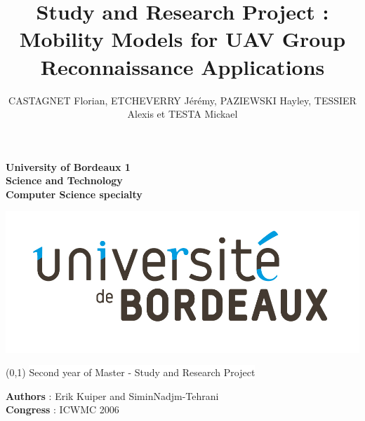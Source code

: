 \documentclass[12pt,a4paper]{report}
\author{CASTAGNET Florian, ETCHEVERRY Jérémy, PAZIEWSKI Hayley, TESSIER Alexis et TESTA Mickael}
\title{Study and Research Project : Mobility Models for UAV Group Reconnaissance Applications}
\begin{document}
\thispagestyle{empty}
\setcounter{page}{0}

\begin{minipage}{0.5\linewidth}
\begin{flushleft}
\textbf{University of Bordeaux 1 \\Science and Technology \\Computer Science specialty}\\ 
\end{flushleft}
\end{minipage}
\begin{minipage}{0.5\linewidth}
\begin{flushright}
\includegraphics[scale = 0.2]{../images/logo}
\end{flushright}
\end{minipage}

\vspace{4cm}

\begin{center}
\boxput*(0,1){
\colorbox{white}{Second year of Master - Study and Research Project}
}
{
\setlength{\fboxsep}{12pt} 
}

\end{center}
\begin{center}
\textbf{Authors} : Erik Kuiper and SiminNadjm-Tehrani\\
\textbf{Congress} : ICWMC 2006
\end{center}
\vspace{3cm}
\end{document}
